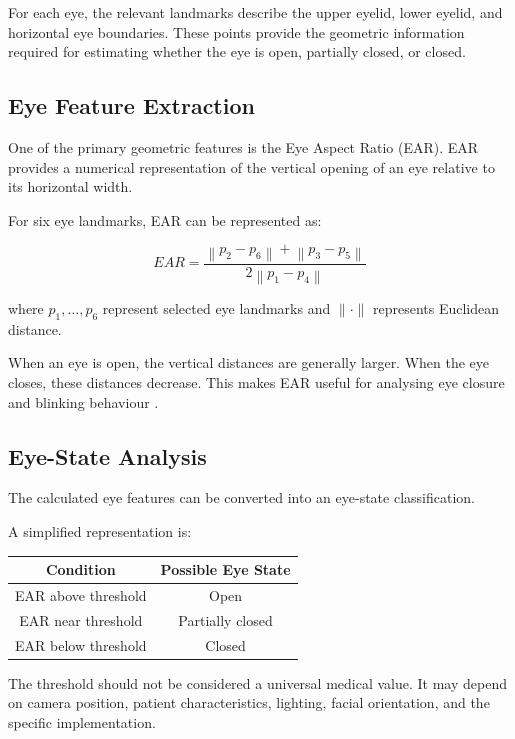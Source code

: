 \documentclass[12pt]{tietreport}
\begin{document}
For each eye, the relevant landmarks describe the upper eyelid,
lower eyelid, and horizontal eye boundaries. These points provide the
geometric information required for estimating whether the eye is
open, partially closed, or closed.

\subsection{Eye Feature Extraction}

One of the primary geometric features is the Eye Aspect Ratio (EAR).
EAR provides a numerical representation of the vertical opening of an
eye relative to its horizontal width.

For six eye landmarks, EAR can be represented as:

\begin{equation}
EAR =
\frac{
\left\|p_2-p_6\right\|
+
\left\|p_3-p_5\right\|
}{
2\left\|p_1-p_4\right\|
}
\end{equation}

where $p_1,\ldots,p_6$ represent selected eye landmarks and
$\|\cdot\|$ represents Euclidean distance.

When an eye is open, the vertical distances are generally larger.
When the eye closes, these distances decrease. This makes EAR useful
for analysing eye closure and blinking behaviour
\cite{soukupova2016eyeblink}.

\subsection{Eye-State Analysis}

The calculated eye features can be converted into an eye-state
classification.

A simplified representation is:

\begin{center}
\begin{tabular}{c|c}
\textbf{Condition} & \textbf{Possible Eye State}\\
\hline
EAR above threshold & Open\\
EAR near threshold & Partially closed\\
EAR below threshold & Closed
\end{tabular}
\end{center}

The threshold should not be considered a universal medical value.
It may depend on camera position, patient characteristics, lighting,
facial orientation, and the specific implementation.
\end{document}
